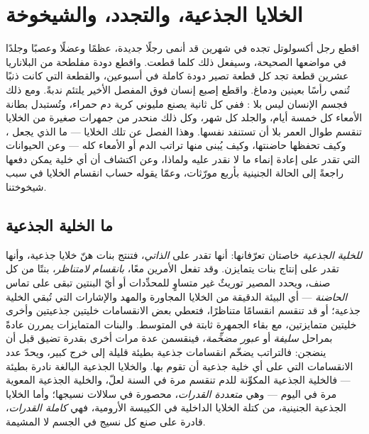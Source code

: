 \chapter{الخلايا الجذعية، والتجدد، والشيخوخة}\label{ch:b3:stem-cells}

اقطع رجل أكسولوتل تجده في شهرين قد أنمى رجلًا جديدة، عظمًا
وعضلًا وعصبًا وجلدًا في مواضعها الصحيحة، وسيفعل ذلك كلما
قطعت. واقطع دودة مفلطحة من البلاناريا عشرين قطعة تجد كل قطعة
تصير دودة كاملة في أسبوعين، والقطعة التي كانت ذنبًا تُنمي
رأسًا بعينين ودماغ. واقطع إصبع إنسان فوق المفصل الأخير يلتئم
ندبةً. ومع ذلك فجسم الإنسان ليس بلا : ففي كل ثانية يصنع
مليوني كرية دم حمراء، وتُستبدل بطانة الأمعاء كل خمسة أيام،
والجلد كل شهر، وكل ذلك منحدر من جمهرات صغيرة من الخلايا
تنقسم طوال العمر بلا أن تستنفد نفسها. وهذا الفصل عن تلك
الخلايا --- ما الذي يجعل ، وكيف تحفظها حاضنتها،
وكيف يُبنى منها تراتب الدم أو الأمعاء كله --- وعن الحيوانات
التي تقدر على إعادة إنماء ما لا نقدر عليه ولماذا، وعن اكتشاف
أن أي خلية يمكن دفعها راجعةً إلى الحالة الجنينية بأربع
مورّثات، وعمّا يقوله حساب انقسام الخلايا في سبب شيخوختنا.

\section{ما الخلية الجذعية}

\begin{definition}\label{def:b3:stem-cells:stem}
\emph{للخلية الجذعية} خاصتان تعرّفانها: أنها تقدر على
\emph{ الذاتي}، فتنتج بنات هنّ خلايا جذعية، وأنها تقدر
على إنتاج بنات يتمايزن. وقد تفعل الأمرين معًا،
\emph{بانقسام لامتناظر}، بنتًا من كل صنف، ويحدد المصير
توريثٌ غير متساوٍ للمحدِّدات أو أيّ البنتين تبقى على تماس
\emph{الحاضنة} --- أي البيئة الدقيقة من الخلايا المجاورة
والمهد والإشارات التي تُبقي الخلية جذعية؛ أو قد تنقسم
انقسامًا متناظرًا، فتعطي بعض الانقسامات خليتين جذعيتين
وأخرى خليتين متمايزتين، مع بقاء الجمهرة ثابتة في المتوسط.
والبنات المتمايزات يمررن عادةً بمراحل \emph{سليفة} أو
\emph{عبور مضخِّمة}، فينقسمن عدة مرات أخرى بقدرة تضيق قبل أن
ينضجن: فالتراتب يضخّم انقسامات جذعية بطيئة قليلة إلى خرج
كبير، ويحدّ عدد الانقسامات التي على أي خلية جذعية أن تقوم
بها. والخلايا الجذعية البالغة نادرة بطيئة --- فالخلية
الجذعية المكوِّنة للدم تنقسم مرة في السنة لعلّ، والخلية
الجذعية المعوية مرة في اليوم --- وهي \emph{متعددة القدرات}،
محصورة في سلالات نسيجها؛ وأما الخلايا الجذعية الجنينية، من
كتلة الخلايا الداخلية في الكييسة الأرومية، فهي \emph{كاملة
القدرات}، قادرة على صنع كل نسيج في الجسم لا المشيمة.
\end{definition}

